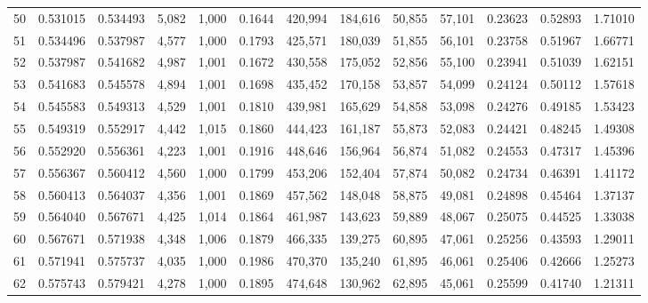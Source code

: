 \begin{tabular}{rrrrrrrrrrrrr}
50  &  0.531015 &  0.534493 &   5,082 &  1,000 &                                     0.1644 &  420,994 &  184,616 &   50,855 &   57,101 &  0.23623 &  0.52893 &  1.71010 \\
51  &  0.534496 &  0.537987 &   4,577 &  1,000 &                                     0.1793 &  425,571 &  180,039 &   51,855 &   56,101 &  0.23758 &  0.51967 &  1.66771 \\
52  &  0.537987 &  0.541682 &   4,987 &  1,001 &                                     0.1672 &  430,558 &  175,052 &   52,856 &   55,100 &  0.23941 &  0.51039 &  1.62151 \\
53  &  0.541683 &  0.545578 &   4,894 &  1,001 &                                     0.1698 &  435,452 &  170,158 &   53,857 &   54,099 &  0.24124 &  0.50112 &  1.57618 \\
54  &  0.545583 &  0.549313 &   4,529 &  1,001 &                                     0.1810 &  439,981 &  165,629 &   54,858 &   53,098 &  0.24276 &  0.49185 &  1.53423 \\
55  &  0.549319 &  0.552917 &   4,442 &  1,015 &                                     0.1860 &  444,423 &  161,187 &   55,873 &   52,083 &  0.24421 &  0.48245 &  1.49308 \\
56  &  0.552920 &  0.556361 &   4,223 &  1,001 &                                     0.1916 &  448,646 &  156,964 &   56,874 &   51,082 &  0.24553 &  0.47317 &  1.45396 \\
57  &  0.556367 &  0.560412 &   4,560 &  1,000 &                                     0.1799 &  453,206 &  152,404 &   57,874 &   50,082 &  0.24734 &  0.46391 &  1.41172 \\
58  &  0.560413 &  0.564037 &   4,356 &  1,001 &                                     0.1869 &  457,562 &  148,048 &   58,875 &   49,081 &  0.24898 &  0.45464 &  1.37137 \\
59  &  0.564040 &  0.567671 &   4,425 &  1,014 &                                     0.1864 &  461,987 &  143,623 &   59,889 &   48,067 &  0.25075 &  0.44525 &  1.33038 \\
60  &  0.567671 &  0.571938 &   4,348 &  1,006 &                                     0.1879 &  466,335 &  139,275 &   60,895 &   47,061 &  0.25256 &  0.43593 &  1.29011 \\
61  &  0.571941 &  0.575737 &   4,035 &  1,000 &                                     0.1986 &  470,370 &  135,240 &   61,895 &   46,061 &  0.25406 &  0.42666 &  1.25273 \\
62  &  0.575743 &  0.579421 &   4,278 &  1,000 &                                     0.1895 &  474,648 &  130,962 &   62,895 &   45,061 &  0.25599 &  0.41740 &  1.21311 \\

\end{tabular}
